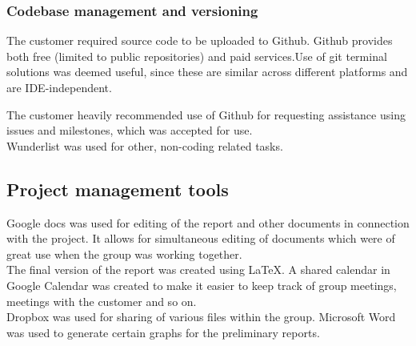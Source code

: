 \subsubsection{Codebase management and versioning}
The customer required source code to be uploaded to Github. Github provides both free (limited to public repositories) and paid services.Use of git terminal solutions was deemed useful, since these are similar across different platforms and are IDE-independent.

The customer heavily recommended use of Github for requesting assistance using issues and milestones, which was accepted for use.\\
Wunderlist was used for other, non-coding related tasks.

\subsection{Project management tools}
Google docs was used for editing of the report and other documents in connection with the project. It allows for simultaneous editing of documents which were of great use when the group was working together.\\
The final version of the report was created using \LaTeX.
A shared calendar in Google Calendar was created to make it easier to keep track of group meetings, meetings with the customer and so on.\\
Dropbox was used for sharing of various files within the group. 
Microsoft Word was used to generate certain graphs for the preliminary reports.\\